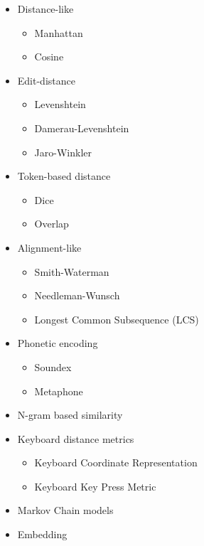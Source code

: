 \begin{itemize}
\item Distance-like
    \begin{itemize}
    \item Manhattan
    \item Cosine
    \end{itemize}
    
\item Edit-distance
\begin{itemize}
    \item Levenshtein
    \item Damerau-Levenshtein
    \item Jaro-Winkler
\end{itemize}

\item Token-based distance
\begin{itemize}
    \item Dice
    \item Overlap
\end{itemize}

\item Alignment-like
\begin{itemize}
    \item Smith-Waterman
    \item Needleman-Wunsch
    \item Longest Common Subsequence (LCS)
\end{itemize}

\item Phonetic encoding
\begin{itemize}
    \item Soundex
    \item Metaphone
\end{itemize}

\item N-gram based similarity

\item Keyboard distance metrics
\begin{itemize}
    \item Keyboard Coordinate Representation
    \item Keyboard Key Press Metric
\end{itemize}

\item Markov Chain models

\item Embedding


\end{itemize}
